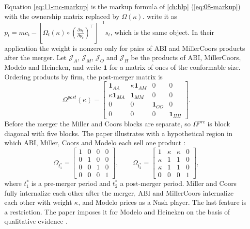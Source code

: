 Equation \eqref{eq:11-mc-markup} is the markup formula of \cref{ch:blp} (\cref{eq:08-markup}) with the ownership
matrix replaced by $\Omega(\kappa)$. \citet[eq.~(9)]{MillerWeinberg2017} write it as
$p_t = mc_t - [\Omega_t(\kappa) \circ (\frac{\partial s_t}{\partial p_t})^\top]^{-1}s_t$, which is the same object.
In their application the weight is nonzero only for pairs of ABI and MillerCoors products after the merger. Let
$\mathcal{J}_A$, $\mathcal{J}_M$, $\mathcal{J}_O$ and $\mathcal{J}_H$ be the products of ABI, MillerCoors, Modelo and
Heineken, and write $\mathbf{1}$ for a matrix of ones of the conformable size. Ordering products by firm, the
post-merger matrix is
\begin{equation}\label{eq:11-mc-omega13}
  \Omega^{post}(\kappa) =
  \begin{bmatrix}
    \mathbf{1}_{AA} & \kappa\mathbf{1}_{AM} & 0 & 0 \\
    \kappa\mathbf{1}_{MA} & \mathbf{1}_{MM} & 0 & 0 \\
    0 & 0 & \mathbf{1}_{OO} & 0 \\
    0 & 0 & 0 & \mathbf{1}_{HH}
  \end{bmatrix}.
\end{equation}
Before the merger the Miller and Coors blocks are separate, so $\Omega^{pre}$ is block diagonal with five blocks.
The paper illustrates with a hypothetical region in which ABI, Miller, Coors and Modelo each sell one product
\citep[eq.~(10)]{MillerWeinberg2017}:
\begin{equation}\label{eq:11-mc-omega4}
  \Omega_{t_1^*} =
  \begin{bmatrix} 1 & 0 & 0 & 0 \\ 0 & 1 & 0 & 0 \\ 0 & 0 & 1 & 0 \\ 0 & 0 & 0 & 1 \end{bmatrix},
  \qquad
  \Omega_{t_2^*} =
  \begin{bmatrix} 1 & \kappa & \kappa & 0 \\ \kappa & 1 & 1 & 0 \\ \kappa & 1 & 1 & 0 \\ 0 & 0 & 0 & 1 \end{bmatrix},
\end{equation}
where $t_1^*$ is a pre-merger period and $t_2^*$ a post-merger period. Miller and Coors fully internalize each other
after the merger, ABI and MillerCoors internalize each other with weight $\kappa$, and Modelo prices as a Nash
player. The last feature is a restriction. The paper imposes it for Modelo and Heineken on the basis of qualitative
evidence \citep[p.~1779]{MillerWeinberg2017}.

